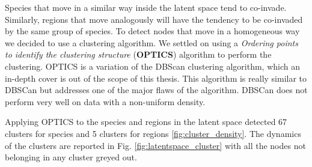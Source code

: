 \documentclass[mscthesis]{usiinfthesis}
\begin{document}
Species that move in a similar way inside the latent space tend to co-invade. Similarly, regions that move analogously will have the tendency to be co-invaded by the same group of species. To detect nodes that move in a homogeneous way we decided to use a clustering algorithm. We settled on using a \textit{Ordering points to identify the clustering structure} (\textbf{OPTICS}) algorithm to perform the clustering. OPTICS is a variation of the DBScan clustering algorithm, which an in-depth cover is out of the scope of this thesis. This algorithm is really similar to DBSCan but addresses one of the major flaws of the algorithm. DBSCan does not perform very well on data with a non-uniform density. 

Applying OPTICS to the species and regions in the latent space detected 67 clusters for species and 5 clusters for regions \ref{fig:cluster_density}. The dynamics of the clusters are reported in Fig. \ref{fig:latentspace_cluster} with all the nodes not belonging in any cluster greyed out. 
\end{document}
